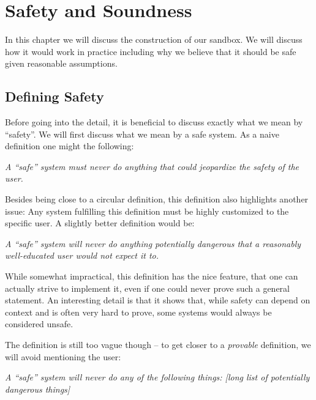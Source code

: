 \chapter{Safety and Soundness}
\label{chap:safesound}

In this chapter we will discuss the construction of our sandbox. We will discuss
how it would work in practice including why we believe that it should be safe
given reasonable assumptions.

\section{Defining Safety}

Before going into the detail, it is beneficial to discuss exactly what we mean
by ``safety''. We will first discuss what we mean by a safe system. As a naive
definition one might the following:

\vspace{0.3cm}
\begin{addmargin}{1cm}
  {\it A ``safe'' system must never do anything that could jeopardize the
    safety of the user.}
\end{addmargin}
\vspace{0.3cm}

Besides being close to a circular definition, this definition also highlights
another issue: Any system fulfilling this definition must be highly customized
to the specific user. A slightly better definition would be:

\vspace{0.3cm}
\begin{addmargin}{1cm}
  {\it A ``safe'' system will never do anything potentially dangerous that a
    reasonably well-educated user would not expect it to.}
\end{addmargin}
\vspace{0.3cm}

While somewhat impractical, this definition has the nice feature, that one can
actually strive to implement it, even if one could never prove such a general
statement. An interesting detail is that it shows that, while safety can depend
on context and is often very hard to prove, some systems would always be
considered unsafe.

The definition is still too vague though -- to get closer to a \emph{provable}
definition, we will avoid mentioning the user:

\vspace{0.3cm}
\begin{addmargin}{1cm}
  {\it A ``safe'' system will never do any of the following things: [long list
    of potentially dangerous things]}
\end{addmargin}
\vspace{0.3cm}

